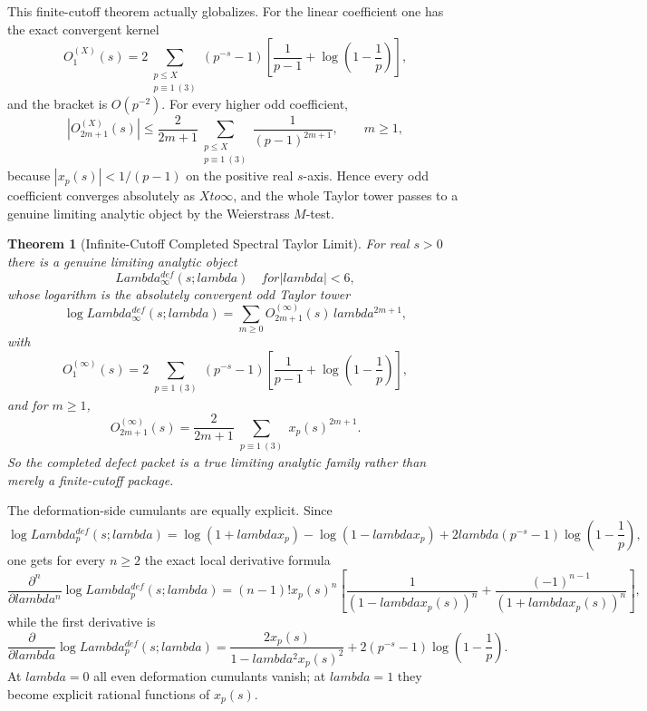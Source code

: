 \documentclass[12pt,a4paper]{article}
\def\mathrm#1{#1}%
\def\mathcal#1{#1}%
\def\text#1{#1}%
\def\lambda{lambda}%
\def\Lambda{Lambda}%
\def\to{ to }%
\newtheorem{theorem}{Theorem}[section]
\theoremstyle{definition}
\begin{document}
This finite-cutoff theorem actually globalizes. For the linear coefficient one has the exact convergent kernel
\[
\mathcal O_1^{(X)}(s)
=
2\sum_{\substack{p\le X\\ p\equiv1\ (3)}}
(p^{-s}-1)
\left[
\frac{1}{p-1}+\log\!\left(1-\frac1p\right)
\right],
\]
and the bracket is $O(p^{-2})$. For every higher odd coefficient,
\[
\left|\mathcal O_{2m+1}^{(X)}(s)\right|
\le
\frac{2}{2m+1}\sum_{\substack{p\le X\\ p\equiv1\ (3)}}\frac{1}{(p-1)^{2m+1}},
\qquad m\ge1,
\]
because $|x_p(s)|<1/(p-1)$ on the positive real $s$-axis. Hence every odd coefficient converges absolutely as $X\to\infty$, and the whole Taylor tower passes to a genuine limiting analytic object by the Weierstrass $M$-test.

\begin{theorem}[Infinite-Cutoff Completed Spectral Taylor Limit]
For real $s>0$ there is a genuine limiting analytic object
\[
\Lambda_\infty^{\mathrm{def}}(s;\lambda)
\quad\text{for }|\lambda|<6,
\]
whose logarithm is the absolutely convergent odd Taylor tower
\[
\log \Lambda_\infty^{\mathrm{def}}(s;\lambda)
=
\sum_{m\ge0}\mathcal O_{2m+1}^{(\infty)}(s)\,\lambda^{2m+1},
\]
with
\[
\mathcal O_1^{(\infty)}(s)
=
2\sum_{\substack{p\equiv1\ (3)}}
(p^{-s}-1)
\left[
\frac{1}{p-1}+\log\!\left(1-\frac1p\right)
\right],
\]
and for $m\ge1$,
\[
\mathcal O_{2m+1}^{(\infty)}(s)
=
\frac{2}{2m+1}\sum_{\substack{p\equiv1\ (3)}} x_p(s)^{2m+1}.
\]
So the completed defect packet is a true limiting analytic family rather than merely a finite-cutoff package.
\end{theorem}

The deformation-side cumulants are equally explicit. Since
\[
\log \Lambda_p^{\mathrm{def}}(s;\lambda)
=
\log(1+\lambda x_p)-\log(1-\lambda x_p)+2\lambda(p^{-s}-1)\log\!\left(1-\frac1p\right),
\]
one gets for every $n\ge2$ the exact local derivative formula
\[
\frac{\partial^n}{\partial\lambda^n}\log \Lambda_p^{\mathrm{def}}(s;\lambda)
=
(n-1)!x_p(s)^n
\left[
\frac{1}{(1-\lambda x_p(s))^n}+\frac{(-1)^{n-1}}{(1+\lambda x_p(s))^n}
\right],
\]
while the first derivative is
\[
\frac{\partial}{\partial\lambda}\log \Lambda_p^{\mathrm{def}}(s;\lambda)
=
\frac{2x_p(s)}{1-\lambda^2x_p(s)^2}+2(p^{-s}-1)\log\!\left(1-\frac1p\right).
\]
At $\lambda=0$ all even deformation cumulants vanish; at $\lambda=1$ they become explicit rational functions of $x_p(s)$.
\end{document}
